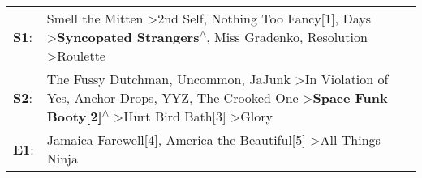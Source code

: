 \begin{supertabular}{p{0.03\textwidth}p{0.92\textwidth}}
 \textbf{S1}:  &                                                                                            Smell the Mitten\textsuperscript{} \textgreater \enspace 2nd Self\textsuperscript{}, \enspace Nothing Too Fancy[1]\textsuperscript{},  Days\textsuperscript{} \textgreater \enspace \textbf{Syncopated Strangers\textsuperscript{$\wedge$}}, \enspace Miss Gradenko\textsuperscript{}, \enspace Resolution\textsuperscript{} \textgreater \enspace Roulette\textsuperscript{}  \enspace  \\
 \textbf{S2}:  &  The Fussy Dutchman\textsuperscript{}, \enspace Uncommon\textsuperscript{}, \enspace JaJunk\textsuperscript{} \textgreater \enspace In Violation of Yes\textsuperscript{}, \enspace Anchor Drops\textsuperscript{}, \enspace YYZ\textsuperscript{}, \enspace The Crooked One\textsuperscript{} \textgreater \enspace \textbf{Space Funk Booty[2]\textsuperscript{$\wedge$}} \textgreater \enspace Hurt Bird Bath[3]\textsuperscript{} \textgreater \enspace Glory\textsuperscript{}  \enspace  \\
 \textbf{E1}:  &                                                                                                                                                                                                                                                                                                                                 Jamaica Farewell[4]\textsuperscript{}, \enspace America the Beautiful[5]\textsuperscript{} \textgreater \enspace All Things Ninja\textsuperscript{}  \enspace  \\
\end{supertabular}
